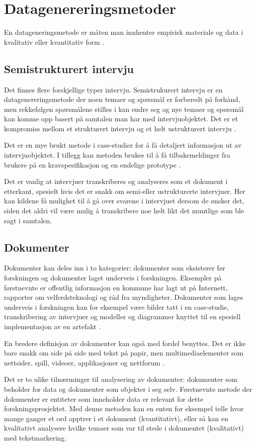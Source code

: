 \section{Datagenereringsmetoder}
En datageneringsmetode er måten man innhenter empirisk materiale og data i kvalitativ
eller kvantitativ form \citep[s. 36]{oates}.

\subsection{Semistrukturert intervju}
Det finnes flere forskjellige typer intervju. Semistrukurert intervju er en datagenereringsmetode
der noen temaer og spørsmål er forberedt på forhånd, men rekkefølgen spørsmålene stilles i kan endre seg
og nye temaer og spørsmål kan komme opp basert på samtalen man har med intervjuobjektet. Det er et
kompromiss mellom et strukturert intervju og et helt ustrukturert intervju \citep[s. 188]{oates}.

Det er en mye brukt metode i case-studier for å få detaljert informasjon ut av intervjuobjektet.
I tillegg kan metoden brukes til å få tilbakemeldinger fra brukere på en kravspesifikasjon og en
endelige prototype \citep[s. 187]{oates}.

Det er vanlig at intervjuer transkriberes og analyseres som et dokument i etterkant, spesielt
hvis det er snakk om semi-eller ustrukturerte intervjuer. Her kan kildene
få mulighet til å gå over svarene i intervjuet dersom de ønsker det, siden det aldri vil være mulig
å transkribere noe helt likt det muntlige som ble sagt i samtalen.

\subsection{Dokumenter}
Dokumenter kan deles inn i to kategorier: dokumenter som eksisterer før forskningen og dokumenter laget underveis
i forskningen. Eksempler på førstnevnte er offentlig informasjon en kommune har lagt ut på Internett, rapporter
om velferdsteknologi og råd fra myndigheter. Dokumenter som lages underveis i forskningen kan for eksempel være
bilder tatt i en case-studie, transkribering av intervjuer
og modeller og diagrammer knyttet til en spesiell implementasjon av en artefakt \citep[s. 233-234]{oates}.

En bredere definisjon av dokumenter kan også med fordel benyttes. Det er ikke bare snakk om side på side med tekst på papir,
men multimediaelementer som nettsider, spill, videoer, applikasjoner og nettforum \citep[s. 235]{oates}.

Det er to ulike tilnærminger til analysering av dokumenter: dokumenter som beholder for data og dokumenter som objekter i seg selv.
Førstnevnte metode der dokumenter er entiteter som inneholder data er relevant for dette forskningsprosjektet.
Med denne metoden kan en enten for eksempel telle hvor mange ganger et ord opptrer i et dokument (kvantitativt),
eller så kan en kvalitativt analysere hvilke temaer som var til stede i dokumentet (kvalitativt) med tekstmarkering.

